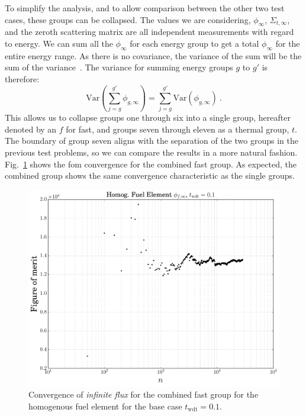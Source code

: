 To simplify the analysis, and to allow comparison between the other
two test cases, these groups can be collapsed. The values we are
considering, $\phi_{\infty}$, $\Sigma_{t,\infty}$, and the zeroth
scattering matrix are all independent measurements with regard to
energy. We can sum all the $\phi_{\infty}$ for each energy group to
get a total $\phi_{\infty}$ for the entire energy range. As there is
no covariance, the variance of the sum will be the sum of the
variance~\cite{taylor1997}. The variance for summing energy groups $g$ to $g'$ is therefore:
\begin{equation*}
  \mathrm{Var}\left( \sum_{j=g}^{g'}\phi_{g,\infty}\right) =   \sum_{j=g}^{g'}\mathrm{Var}\left(\phi_{g,\infty}\right)\:.
\end{equation*}
This allows us to collapse groups one through six into a single group,
hereafter denoted by an $f$ for fast, and groups seven through eleven as
 a thermal group, $t$. The boundary of group seven aligns with the separation
of the two groups in the previous test problems, so we can compare the
results in a more natural
fashion. Fig.~\ref{fig:homog_fom_convergence_example} shows the
\gls{fom} convergence for the combined fast group. As expected, the
combined group shows the same convergence characteristic as the single
groups.

\begin{figure}[hbtp]
  \centering
  \includegraphics[scale=0.5]{images/homog_fom_convergence_example}
  \caption{Convergence of \textit{infinite flux} for the combined fast group
    for the homogenous fuel element for the base case
    $t_{\mathrm{wdt}} = 0.1$.}
  \label{fig:homog_fom_convergence_example}
\end{figure}

